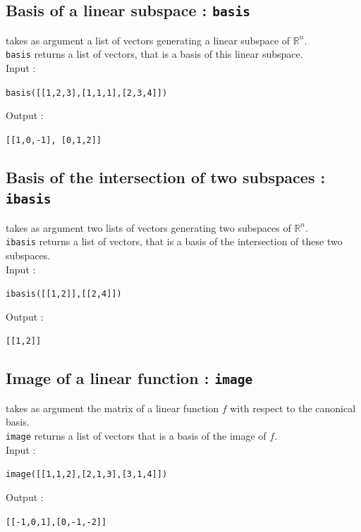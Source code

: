 \documentclass[a4paper,11pt]{book}
\begin{document}
\subsection{Basis of a linear subspace  : {\tt basis}}
 takes as argument a list of vectors generating
a linear subspace of $\mathbb R^n$.\\
{\tt basis} returns a list of vectors, that is a basis of this
linear subspace.\\
Input :
\begin{center}{\tt basis([[1,2,3],[1,1,1],[2,3,4]])}\end{center}
Output :
\begin{center}{\tt [[1,0,-1],\ [0,1,2]]}\end{center}

\subsection{Basis of the intersection of two subspaces : {\tt ibasis}}
 takes as argument two lists of vectors generating
two subspaces of $\mathbb R^n$.\\ 
{\tt ibasis} returns a list of vectors, that is a basis of the 
intersection of these two subspaces.\\
Input :
\begin{center}{\tt ibasis([[1,2]],[[2,4]])}\end{center}
Output :
\begin{center}{\tt [[1,2]]}\end{center}

\subsection{Image of a linear function : {\tt image}}
 takes as argument the matrix of a linear 
function $f$ with respect to the canonical basis.\\
{\tt image} returns a list of vectors that is a basis of the image 
of $f$.\\
Input :
\begin{center}{\tt image([[1,1,2],[2,1,3],[3,1,4]])}\end{center}
Output :
\begin{center}{\tt   [[-1,0,1],[0,-1,-2]]}\end{center}
\end{document}
